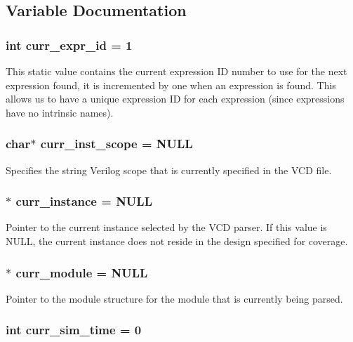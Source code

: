 \subsection{Variable Documentation}
\subsubsection{\setlength{\rightskip}{0pt plus 5cm}int {\bf curr\_\-expr\_\-id} = 1}\label{db_8c_a20}


This static value contains the current expression ID number to use for the next expression found, it is incremented by one when an expression is found. This allows us to have a unique expression ID for each expression (since expressions have no intrinsic names). 
\subsubsection{\setlength{\rightskip}{0pt plus 5cm}char$\ast$ {\bf curr\_\-inst\_\-scope} = NULL}\label{db_8c_a12}


Specifies the string Verilog scope that is currently specified in the VCD file. 
\subsubsection{$\ast$ {\bf curr\_\-instance} = NULL}\label{db_8c_a13}


Pointer to the current instance selected by the VCD parser. If this value is NULL, the current instance does not reside in the design specified for coverage. 
\subsubsection{$\ast$ {\bf curr\_\-module} = NULL}\label{db_8c_a16}


Pointer to the module structure for the module that is currently being parsed. 
\subsubsection{\setlength{\rightskip}{0pt plus 5cm}int {\bf curr\_\-sim\_\-time} = 0}\label{db_8c_a21}


